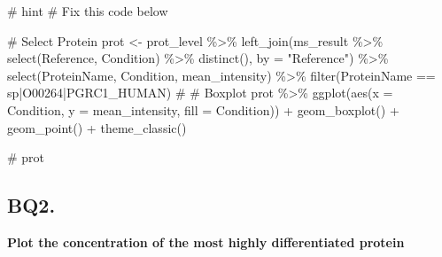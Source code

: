 \documentclass[
  letterpaper,
  DIV=11,
  numbers=noendperiod]{scrartcl}
\newenvironment{Shaded}{\begin{snugshade}}{\end{snugshade}}
\newcommand{\AttributeTok}[1]{\textcolor[rgb]{0.40,0.45,0.13}{#1}}
\newcommand{\CommentTok}[1]{\textcolor[rgb]{0.37,0.37,0.37}{#1}}
\newcommand{\FunctionTok}[1]{\textcolor[rgb]{0.28,0.35,0.67}{#1}}
\newcommand{\NormalTok}[1]{\textcolor[rgb]{0.00,0.23,0.31}{#1}}
\newcommand{\OtherTok}[1]{\textcolor[rgb]{0.00,0.23,0.31}{#1}}
\newcommand{\SpecialCharTok}[1]{\textcolor[rgb]{0.37,0.37,0.37}{#1}}
\newcommand{\StringTok}[1]{\textcolor[rgb]{0.13,0.47,0.30}{#1}}
\begin{document}
\begin{Shaded}
\begin{Highlighting}[]
\CommentTok{\# hint}
\CommentTok{\# Fix this code below}

\CommentTok{\# Select Protein}
\NormalTok{prot }\OtherTok{\textless{}{-}}\NormalTok{ prot\_level }\SpecialCharTok{\%\textgreater{}\%} 
    \FunctionTok{left\_join}\NormalTok{(ms\_result }\SpecialCharTok{\%\textgreater{}\%} \FunctionTok{select}\NormalTok{(Reference, Condition) }\SpecialCharTok{\%\textgreater{}\%} \FunctionTok{distinct}\NormalTok{(), }\AttributeTok{by =} \StringTok{"Reference"}\NormalTok{) }\SpecialCharTok{\%\textgreater{}\%}
    \FunctionTok{select}\NormalTok{(ProteinName, Condition, mean\_intensity) }\SpecialCharTok{\%\textgreater{}\%}
    \FunctionTok{filter}\NormalTok{(ProteinName }\SpecialCharTok{==} \StringTok{\textquotesingle{}sp|O00264|PGRC1\_HUMAN\textquotesingle{}}\NormalTok{)}
\CommentTok{\# \# Boxplot}
\NormalTok{prot }\SpecialCharTok{\%\textgreater{}\%} 
  \FunctionTok{ggplot}\NormalTok{(}\FunctionTok{aes}\NormalTok{(}\AttributeTok{x =}\NormalTok{ Condition, }\AttributeTok{y =}\NormalTok{ mean\_intensity, }\AttributeTok{fill =}\NormalTok{ Condition)) }\SpecialCharTok{+} 
  \FunctionTok{geom\_boxplot}\NormalTok{() }\SpecialCharTok{+} 
  \FunctionTok{geom\_point}\NormalTok{() }\SpecialCharTok{+} 
  \FunctionTok{theme\_classic}\NormalTok{()}
\end{Highlighting}
\end{Shaded}


\begin{Shaded}
\begin{Highlighting}[]
\CommentTok{\# prot}
\end{Highlighting}
\end{Shaded}

\subsection{BQ2.}\label{bq2.}

\textbf{Plot the concentration of the most highly differentiated
protein}
\end{document}
